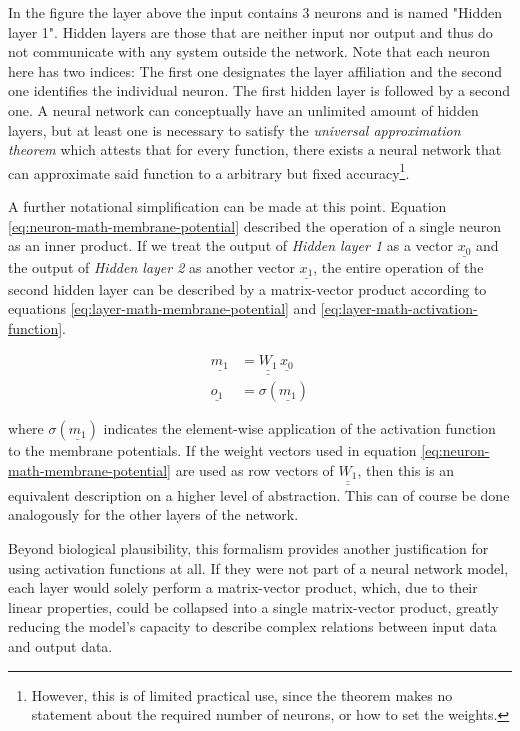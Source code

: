 \documentclass[11pt, a4paper]{article}
\newcommand\braces[1]{\left(#1\right)}
\renewcommand{\vec}[1]{\underline{#1}}
\newcommand{\mat}[1]{\underline{\underline{#1}}}
\begin{document}
In the figure the layer above the input contains 3 neurons and is named "Hidden layer 1". Hidden layers are those that are neither input nor output and thus do not communicate with any system outside the network. Note that each neuron here has two indices: The first one designates the layer affiliation and the second one identifies the individual neuron. The first hidden layer is followed by a second one. A neural network can conceptually have an unlimited amount of hidden layers, but at least one is necessary to satisfy the \emph{universal approximation theorem} which attests that for every function, there exists a neural network that can approximate said function to a arbitrary but fixed accuracy\footnote{However, this is of limited practical use, since the theorem makes no statement about the required number of neurons, or how to set the weights.}.

A further notational simplification can be made at this point. Equation \eqref{eq:neuron-math-membrane-potential} described the operation of a single neuron as an inner product. If we treat the output of \emph{Hidden layer 1} as a vector $\vec{x_0}$ and the output of \emph{Hidden layer 2} as another vector $\vec{x_1}$, the entire operation of the second hidden layer can be described by a matrix-vector product according to equations \eqref{eq:layer-math-membrane-potential} and \eqref{eq:layer-math-activation-function}.

\begin{align}
	\vec{m_1} &= \mat{W_{1}} \, \vec{x_0} \label{eq:layer-math-membrane-potential} \\
	\vec{o_1} &= \sigma \braces{\vec{m_1}} \label{eq:layer-math-activation-function}
\end{align}

where $\sigma \braces{\vec{m_1}}$ indicates the element-wise application of the activation function to the membrane potentials. If the weight vectors used in equation \eqref{eq:neuron-math-membrane-potential} are used as row vectors of $\mat{W_1}$, then this is an equivalent description on a higher level of abstraction. This can of course be done analogously for the other layers of the network.

Beyond biological plausibility, this formalism provides another justification for using activation functions at all. If they were not part of a neural network model, each layer would solely perform a matrix-vector product, which, due to their linear properties, could be collapsed into a single matrix-vector product, greatly reducing the model's capacity to describe complex relations between input data and output data.
\end{document}
